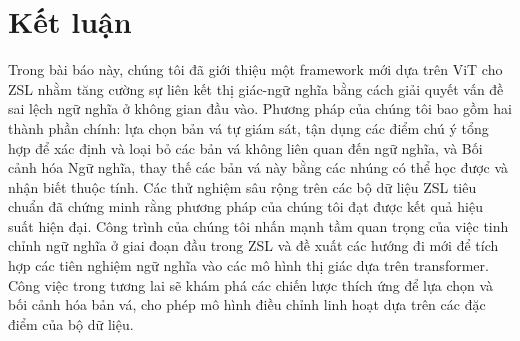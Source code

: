 \section{Kết luận}

Trong bài báo này, chúng tôi đã giới thiệu một framework mới dựa trên ViT cho ZSL nhằm tăng cường sự liên kết thị giác-ngữ nghĩa bằng cách giải quyết vấn đề sai lệch ngữ nghĩa ở không gian đầu vào. Phương pháp của chúng tôi bao gồm hai thành phần chính: lựa chọn bản vá tự giám sát, tận dụng các điểm chú ý tổng hợp để xác định và loại bỏ các bản vá không liên quan đến ngữ nghĩa, và Bối cảnh hóa Ngữ nghĩa, thay thế các bản vá này bằng các nhúng có thể học được và nhận biết thuộc tính. Các thử nghiệm sâu rộng trên các bộ dữ liệu ZSL tiêu chuẩn đã chứng minh rằng phương pháp của chúng tôi đạt được kết quả hiệu suất hiện đại. Công trình của chúng tôi nhấn mạnh tầm quan trọng của việc tinh chỉnh ngữ nghĩa ở giai đoạn đầu trong ZSL và đề xuất các hướng đi mới để tích hợp các tiên nghiệm ngữ nghĩa vào các mô hình thị giác dựa trên transformer. Công việc trong tương lai sẽ khám phá các chiến lược thích ứng để lựa chọn và bối cảnh hóa bản vá, cho phép mô hình điều chỉnh linh hoạt dựa trên các đặc điểm của bộ dữ liệu.
